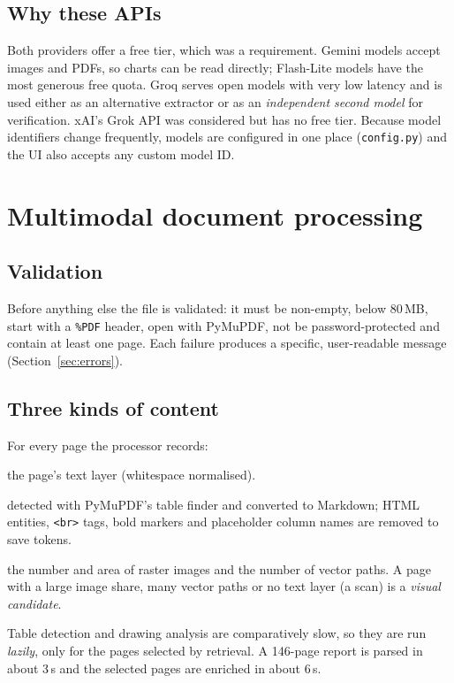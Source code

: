 \documentclass[11pt,a4paper]{article}
\newcommand{\code}[1]{\texttt{\small #1}}
\begin{document}
\subsection{Why these APIs}
Both providers offer a free tier, which was a requirement. Gemini models accept images and PDFs, so
charts can be read directly; Flash-Lite models have the most generous free quota. Groq serves open models
with very low latency and is used either as an alternative extractor or as an \emph{independent second
model} for verification. xAI's Grok API was considered but has no free tier. Because model identifiers
change frequently, models are configured in one place (\code{config.py}) and the UI also accepts any
custom model ID.

\section{Multimodal document processing}\label{sec:pdf}
\subsection{Validation}
Before anything else the file is validated: it must be non-empty, below 80\,MB, start with a \code{\%PDF}
header, open with PyMuPDF, not be password-protected and contain at least one page. Each failure produces
a specific, user-readable message (Section~\ref{sec:errors}).

\subsection{Three kinds of content}
For every page the processor records:
\begin{description}[style=nextline,leftmargin=1.2cm]
  \item[Text] the page's text layer (whitespace normalised).
  \item[Tables] detected with PyMuPDF's table finder and converted to Markdown; HTML entities, \code{<br>}
        tags, bold markers and placeholder column names are removed to save tokens.
  \item[Visuals] the number and area of raster images and the number of vector paths. A page with a large
        image share, many vector paths or no text layer (a scan) is a \emph{visual candidate}.
\end{description}
Table detection and drawing analysis are comparatively slow, so they are run \emph{lazily}, only for the
pages selected by retrieval. A 146-page report is parsed in about 3\,s and the selected pages are enriched
in about 6\,s.
\end{document}
